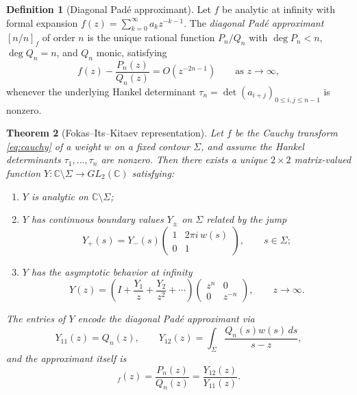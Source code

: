 \documentclass[11pt]{article}
\newtheorem{theorem}{Theorem}[section]
\theoremstyle{definition}
\newtheorem{definition}[theorem]{Definition}
\theoremstyle{remark}
\begin{document}
\begin{definition}[Diagonal Pad\'e approximant]
\label{def:pade}
Let $f$ be analytic at infinity with formal expansion $f(z)=\sum_{k=0}^{\infty}a_{k}z^{-k-1}$. The \emph{diagonal Pad\'e approximant} $[n/n]_{f}$ of order $n$ is the unique rational function $P_{n}/Q_{n}$ with $\deg P_{n}<n$, $\deg Q_{n}=n$, and $Q_{n}$ monic, satisfying
\begin{equation}
f(z)-\frac{P_{n}(z)}{Q_{n}(z)}=O(z^{-2n-1})
\qquad\text{as }z\to\infty,
\label{eq:pade-defining}
\end{equation}
whenever the underlying Hankel determinant $\tau_{n}=\det(a_{i+j})_{0\le i,j\le n-1}$ is nonzero.
\end{definition}

\begin{theorem}[Fokas--Its--Kitaev representation]
\label{thm:fik}
Let $f$ be the Cauchy transform \eqref{eq:cauchy} of a weight $w$ on a fixed contour $\Sigma$, and assume the Hankel determinants $\tau_{1},\dots,\tau_{n}$ are nonzero. Then there exists a unique $2\times 2$ matrix-valued function $Y:\mathbb{C}\setminus\Sigma\to GL_{2}(\mathbb{C})$ satisfying:
\begin{enumerate}[label=(\roman*)]
\item $Y$ is analytic on $\mathbb{C}\setminus\Sigma$;
\item $Y$ has continuous boundary values $Y_{\pm}$ on $\Sigma$ related by the jump
\begin{equation}
Y_{+}(s)=Y_{-}(s)
\begin{pmatrix}
1 & 2\pi i\,w(s)\\
0 & 1
\end{pmatrix},
\qquad s\in\Sigma;
\label{eq:jump}
\end{equation}
\item $Y$ has the asymptotic behavior at infinity
\begin{equation}
Y(z)=\left(I+\frac{Y_{1}}{z}+\frac{Y_{2}}{z^{2}}+\cdots\right)
\begin{pmatrix}
z^{n} & 0\\
0 & z^{-n}
\end{pmatrix},
\qquad z\to\infty.
\label{eq:normalization}
\end{equation}
\end{enumerate}
The entries of $Y$ encode the diagonal Pad\'e approximant via
\begin{equation}
Y_{11}(z)=Q_{n}(z),
\qquad
Y_{12}(z)=\int_{\Sigma}\frac{Q_{n}(s)w(s)\,ds}{s-z},
\label{eq:y-entries}
\end{equation}
and the approximant itself is
\begin{equation}
[n/n]_{f}(z)=\frac{P_{n}(z)}{Q_{n}(z)}=\frac{Y_{12}(z)}{Y_{11}(z)}.
\label{eq:pade-from-y}
\end{equation}
\end{theorem}
\end{document}
